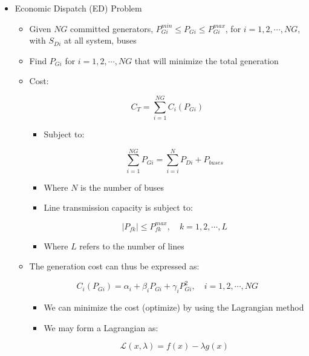 \begin{itemize}

  \item Economic Dispatch (ED) Problem

    \begin{itemize}

      \item Given $NG$ committed generators, $P^{min}_{Gi}\leq P_{Gi}\leq P^{max}_{Gi}$, for $i=1,2,\cdots, NG$, with $S_{Di}$ at all system, buses

      \item Find $P_{Gi}$ for $i=1,2,\cdots,NG$ that will minimize the total generation

      \item Cost:

        $$C_T=\sum_{i=1}^{NG} C_i\left( P_{Gi} \right)$$

        \begin{itemize}

          \item Subject to:

            $$\sum_{i=1}^{NG}P_{Gi}=\sum_{i=i}^N P_{Di}+P_{buses}$$

          \item Where $N$ is the number of buses

          \item Line transmission capacity is subject to:

            $$|P_{fk}|\leq P^{max}_{fk},\quad k=1,2,\cdots,L$$

          \item Where $L$ refers to the number of lines

        \end{itemize}

      \item The generation cost can thus be expressed as:

        $$C_i(P_{Gi})=\alpha_i+\beta_i P_{Gi}+\gamma_iP_{Gi}^2,\quad i=1,2,\cdots,NG$$

        \begin{itemize}

          \item We can minimize the cost (optimize) by using the Lagrangian method

          \item We may form a Lagrangian as:

            $$\mathcal{L}(x,\lambda)=f(x)-\lambda g(x)$$


\end{itemize}
\end{itemize}
\end{itemize}
